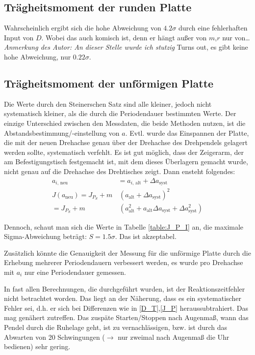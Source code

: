 \subsection{Trägheitsmoment der runden Platte}
Wahrscheinlich ergibt sich die hohe Abweichung von \(4.2\sigma\) durch eine fehlerhaften Input von \(D\). Wobei das auch komisch ist, denn er hängt außer von \(m\),\(r\) nur von\dots \\
\emph{Anmerkung des Autor: An dieser Stelle wurde ich stutzig} 
Turns out, es gibt keine hohe Abweichung, nur \(0.22\sigma\).

\subsection{Trägheitsmoment der unförmigen Platte}
Die Werte durch den Steinerschen Satz sind alle kleiner, jedoch nicht systematisch kleiner, als die durch die Periodendauer bestimmten Werte. Der einzige Unterschied zwischen den Messdaten, die beide Methoden nutzen, ist die Abstandsbestimmung/-einstellung von \(a\). Evtl. wurde das Einspannen der Platte, die mit der neuen Drehachse genau über der Drehachse des Drehpendels gelagert werden sollte, systematisch verfehlt. Es ist gut möglich, dass der Zeigerarm, der am Befestigungstisch festgemacht ist, mit dem dieses Überlagern gemacht wurde, nicht genau auf die Drehachse des Drehtisches zeigt. 
Dann ensteht folgendes:
\begin{align}
    a_{i,\,\text{neu}}&=a_{i,\,\text{alt}}+\Delta a_{\text{syst}}\\
    J(a_{\text{neu}})=J_{P_S}+m&\,(a_{\text{alt}}+\Delta a_{\text{syst}})^2\\
    =J_{P_S}+m&\,(a_{\text{alt}}^2+a_{\text{alt}}\Delta a_{\text{syst}}+\Delta a_{\text{syst}}^2)\label{a_syst}
\end{align}


Dennoch, schaut man sich die Werte in Tabelle \cref{table:J_P_I} an, die maximale Sigma-Abweichung beträgt:
\(S=1.5\sigma\). Das ist akzeptabel.

Zusätzlich könnte die Genauigkeit der Messung für die unförmige Platte durch die Erhebung mehrerer Periodendauern verbessert werden, es wurde pro Drehachse mit \(a_i\) nur eine Periodendauer gemessen. 

In fast allen Berechnungen, die durchgeführt wurden, ist der Reaktionszeitfehler nicht betrachtet worden. Das liegt an der Näherung, dass es ein systematischer Fehler sei, d.h. er sich bei Differenzen wie in \cref{D_T},\cref{J_P} heraussubtrahiert. Das mag genähert zutreffen. Das zuspäte Starten/Stoppen nach Augenmaß, wann das Pendel durch die Ruhelage geht, ist zu vernachlässigen, bzw. ist durch das Abwarten von 20 Schwingungen (\(\rightarrow\) nur zweimal nach Augenmaß die Uhr bedienen) sehr gering.


